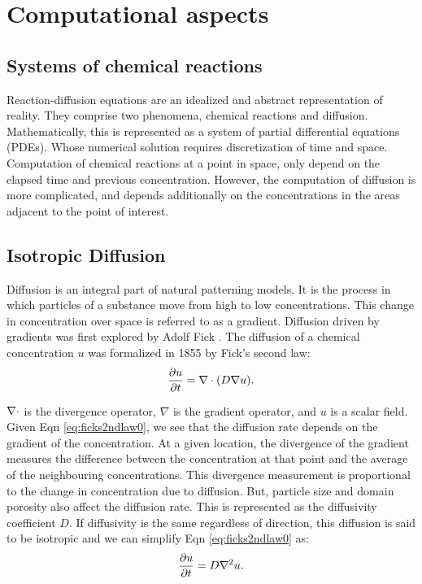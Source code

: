\newcommand{\Morph}{u}

\chapter{Computational aspects}

\section{Systems of chemical reactions}
Reaction-diffusion equations are an idealized and abstract representation of reality. They comprise two phenomena, chemical reactions and diffusion. Mathematically, this is represented as a system of partial differential equations (PDEs). Whose numerical solution requires discretization of time and space. Computation of chemical reactions at a point in space, only depend on the elapsed time and previous concentration. However, the computation of diffusion is more complicated, and depends additionally on the concentrations in the areas adjacent to the point of interest.

\section{Isotropic Diffusion}
Diffusion is an integral part of natural patterning models. It is the process in which particles of a substance move from high to low concentrations. This change in concentration over space is referred to as a gradient. Diffusion driven by gradients was first explored by Adolf Fick \citep{fick1995liquid}. The diffusion of a chemical concentration $\Morph$ was formalized in 1855 by Fick's second law:
\begin{equation}
\label{eq:ficks2ndlaw0}
	\frac{\partial \Morph}{\partial t} = \Div (D \nabla \Morph).
\end{equation}
	
$\nabla \cdot$ is the divergence operator, $\nabla$ is the gradient operator, and $u$ is a scalar field. Given Eqn \ref{eq:ficks2ndlaw0}, we see that the diffusion rate depends on the gradient of the concentration. At a given location, the divergence of the gradient measures the difference between the concentration at that point and the average of the neighbouring concentrations. This divergence measurement is proportional to the change in concentration due to diffusion. But, particle size and domain porosity also affect the diffusion rate. This is represented as the diffusivity coefficient $D$. If diffusivity is the same regardless of direction, this diffusion is said to be isotropic and we can simplify Eqn \ref{eq:ficks2ndlaw0} as:
\begin{equation}
\label{eq:ficks2ndlaw1}
	\frac{\partial \Morph}{\partial t} = D \Lap \Morph.
\end{equation}
	
